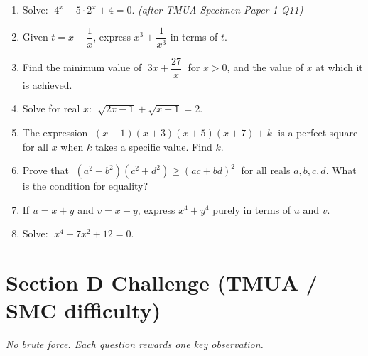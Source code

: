 \documentclass[11pt,a4paper]{article}
\begin{document}
\begin{enumerate}

\item Solve: $\;4^x - 5 \cdot 2^x + 4 = 0$. \textit{\small(after TMUA Specimen Paper 1 Q11)}

\item Given $t = x + \dfrac{1}{x}$, express $x^3 + \dfrac{1}{x^3}$ in terms of $t$.

\item Find the minimum value of $\;3x + \dfrac{27}{x}\;$ for $x > 0$,
      and the value of $x$ at which it is achieved.

\item Solve for real $x$: $\;\sqrt{2x - 1} + \sqrt{x - 1} = 2$.

\item The expression $\;(x+1)(x+3)(x+5)(x+7) + k\;$ is a perfect square for
      all $x$ when $k$ takes a specific value. Find $k$.

\item Prove that $\;(a^2 + b^2)(c^2 + d^2) \geq (ac + bd)^2\;$ for all reals
      $a,b,c,d$. What is the condition for equality?

\item If $u = x + y$ and $v = x - y$, express $x^4 + y^4$ purely in terms of $u$ and $v$.

\item Solve: $\;x^4 - 7x^2 + 12 = 0$.

\end{enumerate}

\section*{Section D \quad Challenge \hfill{\normalfont\small(TMUA / SMC difficulty)}}

\noindent\textit{No brute force. Each question rewards one key observation.}
\end{document}
